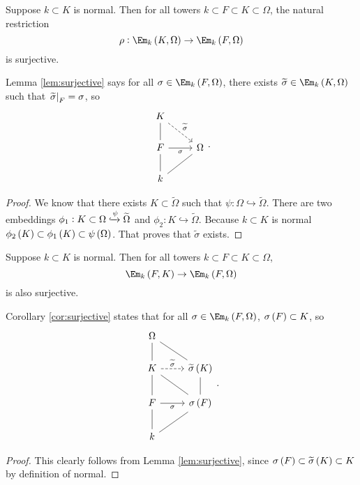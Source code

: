 \begin{lemma}
\label{lem:surjective}
Suppose $ k \subset K $ is normal. Then for all towers $ k \subset F \subset K \subset \Omega $, the natural restriction
$$ \rho : \Em_k\br{K, \Omega} \to \Em_k\br{F, \Omega} $$
is surjective.
\end{lemma}


Lemma \ref{lem:surjective} says for all $ \sigma \in \Em_k\br{F, \Omega} $, there exists $ \widetilde{\sigma} \in \Em_k\br{K, \Omega} $ such that $ \left. \widetilde{\sigma} \right|_F = \sigma $, so
$$
\begin{tikzcd}
K \arrow[dashed]{dr}{\widetilde{\sigma}} & \\
F \arrow[dash]{u} \arrow[swap]{r}{\sigma} & \Omega \\
k \arrow[dash]{u} \arrow[dash]{ur} &
\end{tikzcd}.
$$

\begin{proof}
We know that there exists $ K \subset \widetilde{\Omega} $ such that $ \psi : \Omega \hookrightarrow \widetilde{\Omega} $. There are two embeddings $ \phi_1 : K \subset \Omega \xhookrightarrow{\psi} \widetilde{\Omega} $ and $ \phi_2 : K \hookrightarrow \widetilde{\Omega} $. Because $ k \subset K $ is normal $ \phi_2\br{K} \subset \phi_1\br{K} \subset \psi\br{\Omega} $. That proves that $ \widetilde{\sigma} $ exists.
\end{proof}

\begin{corollary}
\label{cor:surjective}
Suppose $ k \subset K $ is normal. Then for all towers $ k \subset F \subset K \subset \Omega $,
$$ \Em_k\br{F, K} \to \Em_k\br{F, \Omega} $$
is also surjective.
\end{corollary}

Corollary \ref{cor:surjective} states that for all $ \sigma \in \Em_k\br{F, \Omega} $, $ \sigma\br{F} \subset K $, so
$$
\begin{tikzcd}
\Omega & \\
K \arrow[dash]{u} \arrow[dashed]{r}{\widetilde{\sigma}} & \widetilde{\sigma}\br{K} \arrow[dash]{ul} \\
F \arrow[dash]{u} \arrow[swap]{r}{\sigma} & \sigma\br{F} \arrow[dash]{ul} \arrow[dash]{u} \\
k \arrow[dash]{u} \arrow[dash]{ur} &
\end{tikzcd}.
$$

\begin{proof}
This clearly follows from Lemma \ref{lem:surjective}, since $ \sigma\br{F} \subset \widetilde{\sigma}\br{K} \subset K $ by definition of normal.
\end{proof}

